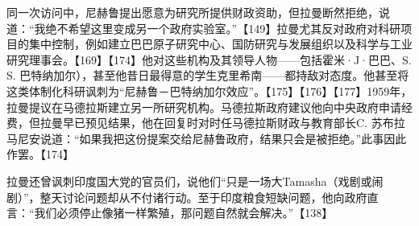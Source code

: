 同一次访问中，尼赫鲁提出愿意为研究所提供财政资助，但拉曼断然拒绝，说道：“我绝不希望这里变成另一个政府实验室。”【149】拉曼尤其反对政府对科研项目的集中控制，例如建立巴巴原子研究中心、国防研究与发展组织以及科学与工业研究理事会。【169】【174】他对这些机构及其领导人物——包括霍米·J·巴巴、S. S. 巴特纳加尔），甚至他昔日最得意的学生克里希南——都持敌对态度。他甚至将这类体制化科研讽刺为“尼赫鲁－巴特纳加尔效应”。【175】【176】【177】1959年，拉曼提议在马德拉斯建立另一所研究机构。马德拉斯政府建议他向中央政府申请经费，但拉曼早已预见结果，他在回复时对时任马德拉斯财政与教育部长C. 苏布拉马尼安说道：“如果我把这份提案交给尼赫鲁政府，结果只会是被拒绝。”此事因此作罢。【174】

拉曼还曾讽刺印度国大党的官员们，说他们“只是一场大Tamasha（戏剧或闹剧）”，整天讨论问题却从不付诸行动。至于印度粮食短缺问题，他向政府直言：“我们必须停止像猪一样繁殖，那问题自然就会解决。”【138】
